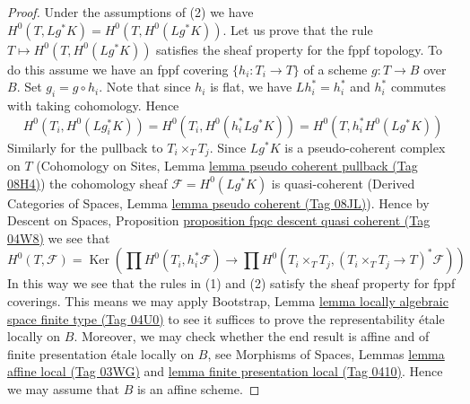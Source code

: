 \documentclass{amsart}
\theoremstyle{plain}
\theoremstyle{definition}
\theoremstyle{remark}
\numberwithin{equation}{subsection}
\def\Ker{\mathop{\mathrm{Ker}}}
\begin{document}
\begin{proof}
Under the assumptions of (2) we have $H^0(T, Lg^*K) = H^0(T, H^0(Lg^*K))$.
Let us prove that the rule $T \mapsto H^0(T, H^0(Lg^*K))$ satisfies the
sheaf property for the fppf topology. To do this assume we have an
fppf covering $\{h_i : T_i \to T\}$ of a scheme $g : T \to B$ over $B$.
Set $g_i = g \circ h_i$. Note that since $h_i$ is flat, we have
$Lh_i^* = h_i^*$ and $h_i^*$ commutes with taking cohomology. Hence
$$
H^0(T_i, H^0(Lg_i^*K)) =
H^0(T_i, H^0(h_i^*Lg^*K)) =
H^0(T, h_i^*H^0(Lg^*K))
$$
Similarly for the pullback to $T_i \times_T T_j$.
Since $Lg^*K$ is a pseudo-coherent complex on $T$
(Cohomology on Sites, Lemma
\href{https://stacks.math.columbia.edu/tag/08H4}{lemma pseudo coherent pullback (Tag 08H4)})
the cohomology sheaf $\mathcal{F} = H^0(Lg^*K)$ is quasi-coherent
(Derived Categories of Spaces, Lemma
\href{https://stacks.math.columbia.edu/tag/08JL}{lemma pseudo coherent (Tag 08JL)}).
Hence by Descent on Spaces, Proposition
\href{https://stacks.math.columbia.edu/tag/04W8}{proposition fpqc descent quasi coherent (Tag 04W8)}
we see that
$$
H^0(T, \mathcal{F}) = \Ker(
\prod H^0(T_i, h_i^*\mathcal{F}) \to
\prod H^0(T_i \times_T T_j, (T_i \times_T T_j \to T)^*\mathcal{F}))
$$
In this way we see that the rules in (1) and (2) satisfy
the sheaf property for fppf coverings. This means we may apply
Bootstrap, Lemma \href{https://stacks.math.columbia.edu/tag/04U0}{lemma locally algebraic space finite type (Tag 04U0)}
to see it suffices to prove the representability \'etale locally on $B$.
Moreover, we may check whether the end result is affine and
of finite presentation \'etale locally on $B$, see
Morphisms of Spaces, Lemmas \href{https://stacks.math.columbia.edu/tag/03WG}{lemma affine local (Tag 03WG)} and
\href{https://stacks.math.columbia.edu/tag/0410}{lemma finite presentation local (Tag 0410)}.
Hence we may assume that $B$ is an affine scheme.


\end{proof}
\end{document}
